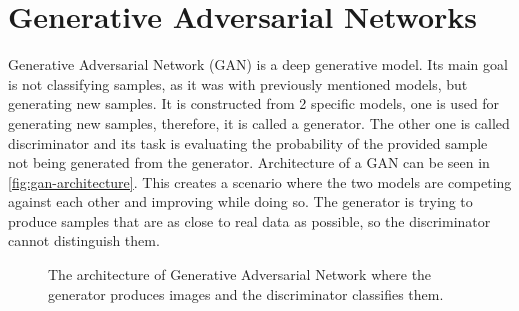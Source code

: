 \section{\label{sec:generative-adversarial-networks}Generative Adversarial Networks}
Generative Adversarial Network (GAN) is a deep generative model. Its main goal is not classifying samples, as it was with previously mentioned models, but generating new samples. It is constructed from 2 specific models, one is used for generating new samples, therefore, it is called a generator.
The other one is called discriminator and its task is evaluating the probability of the provided sample not being generated from the generator. Architecture of a GAN can be seen in \autoref{fig:gan-architecture}. This creates a scenario where the two models are competing against each other and improving while doing so. The generator is trying to produce samples that are as close to real data as possible, so the discriminator cannot distinguish them.

\begin{figure}[!h]
    \centering
    \caption{\label{fig:gan-architecture}The architecture of Generative Adversarial Network where the generator produces images and the discriminator classifies them.}
\end{figure}

